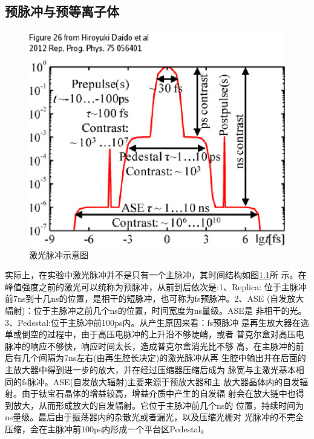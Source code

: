 

\chapter{}
\label{chap:guide}

\section{预脉冲与预等离子体}
\begin{figure}[!htbp]
  \centering
  \includegraphics[width=\MyFactor\textwidth]{Img/prepulse2012.eps}
  \caption{激光脉冲示意图}
  \label{fig:prepulse2012}
\end{figure}

实际上，在实验中激光脉冲并不是只有一个主脉冲，其时间结构如图\ref{fig:prepulse2012}所
示。在峰值强度之前的激光可以统称为预脉冲，从前到后依次是:1、Replica:
位于主脉冲前7ns到十几ns的位置，是相干的短脉冲，也可称为fs预脉冲。2、ASE
(自发放大辐射)：位于主脉冲之前几个ns的位置，时间宽度为ns量级。ASE是
非相干的光。3、Pedestal:位于主脉冲前100ps内。从产生原因来看：fs预脉冲
是再生放大器在选单或倒空的过程中，由于高压电脉冲的上升沿不够陡峭，或者
普克尔盒对高压电脉冲的响应不够快，响应时间太长，造成普克尔盒消光比不够
高，在主脉冲的前后有几个间隔为7ns左右(由再生腔长决定)的激光脉冲从再
生腔中输出并在后面的主放大器中得到进一步的放大，并在经过压缩器压缩后成为
脉宽与主激光基本相同的fs脉冲。ASE(自发放大辐射)主要来源于预放大器和主
放大器晶体内的自发辐射。由于钛宝石晶体的增益较高，增益介质中产生的自发辐
射会在放大链中也得到放大，从而形成放大的自发辐射。它位于主脉冲前几个ns的
位置，持续时间为ns量级。最后由于振荡器内的杂散光或者漏光，以及压缩光栅对
光脉冲的不完全压缩，会在主脉冲前100ps内形成一个平台区Pedestal。


